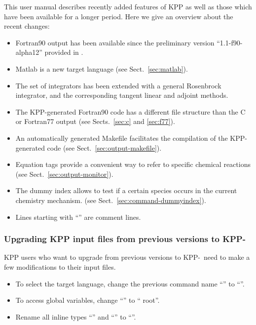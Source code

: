 \documentclass[twoside]{article}
\newcommand{\kpproot}{{\sc root}}
\begin{document}
This user manual describes recently added features of KPP as well as
those which have been available for a longer period. Here we give an
overview about the recent changes:

\begin{itemize}
\item Fortran90 output has been available since the preliminary version
  ``1.1-f90-alpha12'' provided in \citet{1666}.
\item Matlab is a new target language (see Sect.~\ref{sec:matlab}).
\item The set of integrators has been extended with a general Rosenbrock
  integrator, and the corresponding tangent linear and adjoint methods.
\item The KPP-generated Fortran90 code has a different file structure
  than the C or Fortran77 output (see Sects.~\ref{sec:c} and
  \ref{sec:f77}).
\item An automatically generated Makefile facilitates the compilation of
  the KPP-generated code (see Sect.~\ref{sec:output-makefile}).
\item Equation tags provide a convenient way to refer to specific
  chemical reactions (see Sect.~\ref{sec:output-monitor}).
\item The dummy index allows to test if a certain species occurs in the
  current chemistry mechanism. (see Sect.~\ref{sec:command-dummyindex}).
\item Lines starting with ``\code{//}'' are comment lines.
\end{itemize}

\subsubsection{Upgrading KPP input files from previous versions to
  KPP-\thiskppversion}

KPP users who want to upgrade from previous versions to
KPP-\thiskppversion\ need to make a few modifications to their input
files.

\begin{itemize}
\item To select the target language, change the previous command name
  ``'' to ``''.
\item To access global variables, change ``'' to
  `` \kpproot{}''.
\item Rename all inline types ``'' and ``'' to
  ``''.
\end{itemize}
\end{document}
